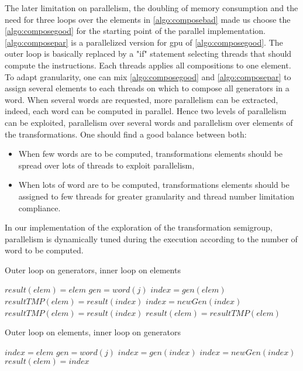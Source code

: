 {The later limitation on parallelism, the doubling of memory consumption and the need for three loops over the elements in \autoref{algo:composebad} made us choose the \autoref{algo:composegood} for the starting point of the parallel implementation.
\autoref{algo:composepar} is a parallelized version for \gls{gpu} of \autoref{algo:composegood}. 
The outer loop is basically replaced by a "if" statement selecting threads that should compute the instructions. Each threads applies all compositions to one element. 
To adapt granularity, one can mix \autoref{algo:composegood} and \autoref{algo:composepar} to assign several elements to each threads on which to compose all generators in a word.
When several words are requested, more parallelism can be extracted, indeed, each word can be computed in parallel. 
Hence two levels of parallelism can be exploited, parallelism over several words and parallelism over elements of the transformations. One should find a good balance between both:
\begin{itemize}
\item When few words are to be computed, transformations elements should be spread over lots of threads to exploit parallelism,
\item When lots of word are to be computed, transformations elements should be assigned to few threads for greater granularity and thread number limitation compliance.
\end{itemize}
In our implementation of the exploration of the transformation semigroup, parallelism is dynamically tuned during the execution according to the number of word to be computed.



\begin{algorithm}
\caption{Outer loop on generators, inner loop on elements}
\label{algo:composebad}
\begin{algorithmic}
\STATE $result(elem) = elem$
\ENDFOR
{}
\STATE $gen = word(j)$
\STATE $index = gen(elem)$
\STATE $resultTMP(elem) = result(index)$
\ENDFOR
\STATE $index = newGen(index)$
\STATE $resultTMP(elem) = result(index)$
\STATE $result(elem) = resultTMP(elem)$
\ENDFOR
\ENDFOR
\end{algorithmic}
\end{algorithm}



\begin{algorithm}
\caption{Outer loop on elements, inner loop on generators}
\label{algo:composegood}
\begin{algorithmic}
\STATE $index = elem$
\STATE $gen = word(j)$
\STATE $index = gen(index)$
\ENDFOR
\STATE $index = newGen(index)$
\STATE $result(elem) = index$
\ENDFOR
\end{algorithmic}
\end{algorithm}


}

